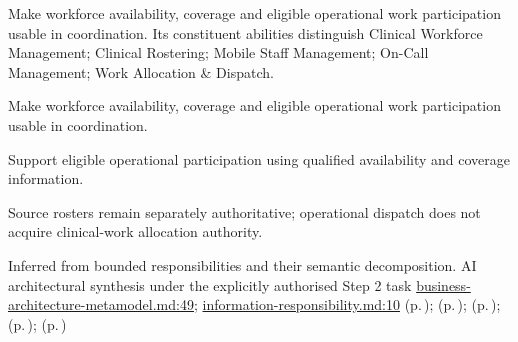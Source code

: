 Make workforce availability, coverage and eligible operational work participation usable in coordination. Its constituent abilities distinguish Clinical Workforce Management; Clinical Rostering; Mobile Staff Management; On-Call Management; Work Allocation \& Dispatch.



Make workforce availability, coverage and eligible operational work participation usable in coordination.



Support eligible operational participation using qualified availability and coverage information.



Source rosters remain separately authoritative; operational dispatch does not acquire clinical-work allocation authority.


Inferred from bounded responsibilities and their semantic decomposition. AI architectural synthesis under the explicitly authorised Step 2 task \hyperref[evidence:4bac85accd34ce0b]{business-architecture-metamodel.md:49}; \hyperref[evidence:be61392fefb4bb10]{information-responsibility.md:10}
 (p.\,\pageref{cap:bec-clinical-workforce-management});  (p.\,\pageref{cap:bec-clinical-rostering});  (p.\,\pageref{cap:bec-mobile-staff-management});  (p.\,\pageref{cap:bec-on-call-management});  (p.\,\pageref{cap:bec-work-allocation-dispatch})
